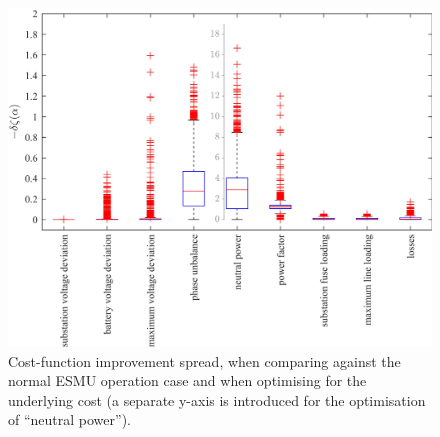 \begin{figure}\centering
	\includegraphics[width=\textwidth]{_chapter1/fig/results/boxplot-overall-improvements}
\caption{Cost-function improvement spread, when comparing against the normal ESMU operation case and when optimising for the underlying cost (a separate y-axis is introduced for the optimisation of ``neutral power'').}
\label{ch1:fig:boxplot-overall-improvements}
\end{figure}